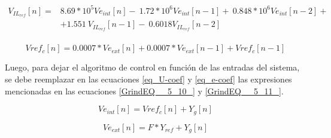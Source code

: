 \begin{equation} 
	\begin{aligned}\label{eq_U-coef}
		V_{IL_{ref}}[n]=&8.69*10^5Ve_{int}[n]-\ 1.72*10^6Ve_{int}[n-1]+\ 0.848*10^6Ve_{int}[n-2]+\\
		&+1.551\ V_{IL_{ref}}[n-1]-\ 0.6018V_{IL_{ref}}[n-2]\\ 
	\end{aligned}
\end{equation}

\begin{equation} \label{eq_e-coef} 
	Vref_c[n]=0.0007*Ve_{ext}[n] +0.0007*Ve_{ext}[n-1]+Vref_c[n-1] 
\end{equation} 

Luego, para dejar el algoritmo de control en funci\'{o}n de las entradas del sistema, se debe reemplazar en las ecuaciones \ref{eq_U-coef} y \ref{eq_e-coef} las expresiones mencionadas en las ecuaciones \ref{GrindEQ__5_10_} y \ref{GrindEQ__5_11_}.

\begin{equation} \label{GrindEQ__5_10_} 
	Ve_{int}[n]=Vref_c[n]+Y_g[n] 
\end{equation} 

\begin{equation} \label{GrindEQ__5_11_} 
	Ve_{ext}[n]=F*Y_{ref}+Y_g[n] 
\end{equation} 

%
%
% 







